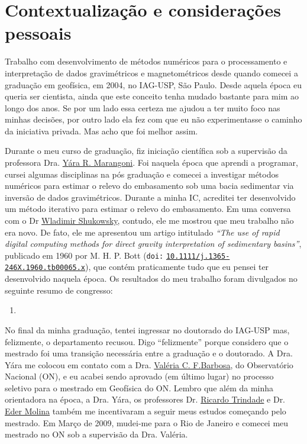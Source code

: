 \section{Contextualização e considerações pessoais}
\label{sec:apresentacao-consideracoes}

Trabalho com desenvolvimento de métodos numéricos para o processamento e
interpretação de dados gravimétricos e magnetométricos desde quando comecei
a graduação em geofísica, em 2004, no IAG-USP, São Paulo.
Desde aquela época eu queria ser cientista, ainda que este conceito tenha mudado 
bastante para mim ao longo dos anos. Se por um lado essa certeza me ajudou a 
ter muito foco nas minhas decisões, por outro lado ela fez com que eu não experimentasse
o caminho da iniciativa privada. Mas acho que foi melhor assim.

\bigskip

\noindent Durante o meu curso de graduação, fiz iniciação
científica sob a supervisão da professora Dra. \href{https://lattes.cnpq.br/5050611044655332}{Y{\'a}ra R. Marangoni}. 
Foi naquela época que aprendi a programar, cursei algumas disciplinas na pós graduação e 
comecei a investigar métodos numéricos para estimar o relevo do embasamento sob uma bacia
sedimentar via inversão de dados gravimétricos. 
Durante a minha IC, acreditei ter desenvolvido um método iterativo para estimar o relevo do
embasamento. 
Em uma conversa com o Dr \href{https://lattes.cnpq.br/6171841822916587}{Wladimir Shukowsky}, contudo, ele me mostrou que meu trabalho não era novo.
De fato, ele me apresentou um artigo intitulado 
\textit{``The use of rapid digital computing methods for direct gravity interpretation of sedimentary basins''}, publicado em 1960 por M. H. P. Bott (\texttt{doi:} \href{https://doi.org/10.1111/j.1365-246X.1960.tb00065.x}{\texttt{10.1111/j.1365-246X.1960.tb00065.x}}), que contém praticamente tudo que eu pensei ter desenvolvido naquela época.
Os resultados do meu trabalho foram divulgados no seguinte resumo de congresso:
\begin{enumerate}
	\item {}
\end{enumerate}

\bigskip

\noindent No final da minha graduação, tentei ingressar no doutorado do IAG-USP mas, 
felizmente, o departamento recusou. Digo ``felizmente'' porque considero que o mestrado 
foi uma transição necessária entre a graduação e o doutorado.
A Dra. Y{\'a}ra me colocou em contato com a Dra. \href{https://lattes.cnpq.br/0391036221142471}{Valéria C. F.Barbosa}, do Observatório Nacional (ON), e eu acabei sendo aprovado (em último lugar)
no processo seletivo para o mestrado em Geofísica do ON. Lembro que além da minha
orientadora na época, a Dra. Yára, os professores 
Dr. \href{https://lattes.cnpq.br/3934334115083849}{Ricardo Trindade} e
Dr. \href{https://lattes.cnpq.br/0921576804781499}{Eder Molina} também 
me incentivaram a seguir meus estudos começando pelo mestrado.
Em Março de 2009, mudei-me para o Rio de Janeiro e comecei meu mestrado no ON sob a
supervisão da Dra. Valéria.

